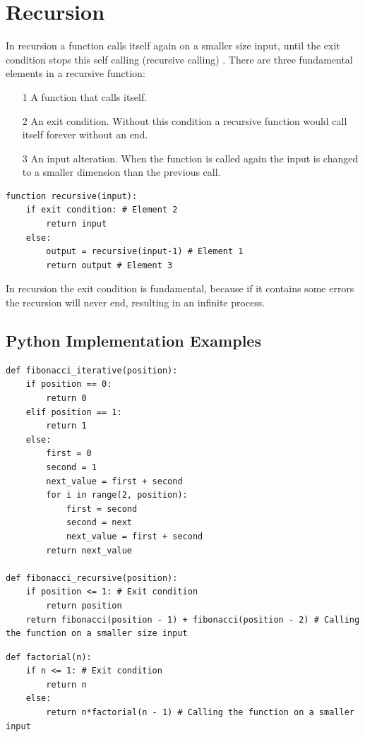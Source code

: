\section{Recursion}
In recursion a function calls itself again on a smaller size input, until the exit condition stops this self calling (recursive calling) \cite{wikirecursion}. There are three fundamental elements in a recursive function:
\begin{itemize}
\item[1] A function that calls itself.
\item[2] An exit condition. Without this condition a recursive function would call itself forever without an end.
\item[3] An input alteration. When the function is called again the input is changed to a smaller dimension than the previous call.
\end{itemize}

\begin{lstlisting}[numbers=none, caption={Pseudocode of a recursive function and its internal execution.}]
function recursive(input):
	if exit condition: # Element 2
		return input
	else:
		output = recursive(input-1) # Element 1
		return output # Element 3
\end{lstlisting}

In recursion the exit condition is fundamental, because if it contains some errors the recursion will never end, resulting in an infinite process.

\subsection{Python Implementation Examples}

\begin{lstlisting}[firstnumber=1, caption={Implementation of the Fibonacci series with both iterative and recursive way.}]
def fibonacci_iterative(position):
	if position == 0:
		return 0
	elif position == 1:
		return 1
	else:
		first = 0
		second = 1
		next_value = first + second
		for i in range(2, position):
			first = second
			second = next
			next_value = first + second
		return next_value

def fibonacci_recursive(position):
	if position <= 1: # Exit condition
		return position
	return fibonacci(position - 1) + fibonacci(position - 2) # Calling the function on a smaller size input
\end{lstlisting}

\begin{lstlisting}[firstnumber=1, caption={Implementation of calculating the factorial of a number using the recursive way.}]
def factorial(n):
	if n <= 1: # Exit condition
		return n
	else: 
		return n*factorial(n - 1) # Calling the function on a smaller input
\end{lstlisting}

